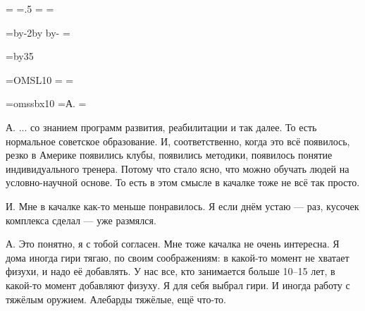 \pdfpagewidth=297mm
\pdfpageheight=210mm
\pdfhorigin=1in
\pdfvorigin=0pt

\shhtotal=\pdfpagewidth
\htotal=.5\shhtotal
\vtotal=\pdfpageheight
\shoutline=0pt
\shstaplewidth=0pt
\shcrop=0pt
\shfootline={}
\shthickness=0pt %

\horigin=9mm
\hoffset=-9mm
\hsize=\htotal \advance\hsize by-2\horigin \advance\hsize by\hoffset
\advance\horigin by-\hoffset
\output={\ifodd\pageno\hoffset=0pt\fi \plainoutput}

\vorigin=15mm
\vsize=\topskip \advance\vsize by35\baselineskip

\font\TENSL=OMSL10
\headline={\line{\hrulefill}}
\footline={\line{\hss\tenrm\folio\hss}}

\font\speakerF=omssbx10
\def\A{\item{\speakerF А.}}
\def\I{\item{\speakerF И.}}
\def\L{\item{\speakerF Л.}}
\def\N{\item{\speakerF Н.}}
=\hbox{\speakerF А.\enskip}
\parindent=


\A
... со знанием программ развития, реабилитации и так далее.
То есть нормальное советское образование.
И, соответственно, когда это всё появилось,
резко в Америке появились клубы, появились методики,
появилось понятие индивидуального тренера.
Потому что стало ясно, что можно обучать людей на условно-научной основе.
То есть в этом смысле в качалке тоже не всё так просто.

\I
Мне в качалке как-то меньше понравилось.
Я если днём устаю --- раз, кусочек комплекса сделал --- уже размялся.

\A
Это понятно, я с тобой согласен.
Мне тоже качалка не очень интересна.
Я дома иногда гири тягаю, по своим соображениям:
в какой-то момент не хватает физухи, и надо её добавлять.
У нас все, кто занимается больше 10--15 лет, в какой-то момент добавляют физуху.
Я для себя выбрал гири. И иногда работу с тяжёлым оружием.
Алебарды тяжёлые, ещё что-то.

